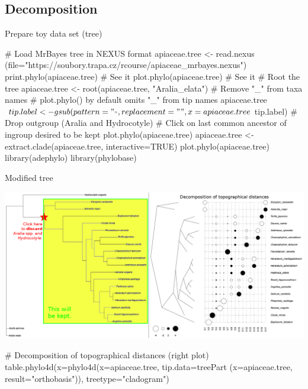 \documentclass[compress, ucs, xelatex, 11pt, xcolor=svgnames,
	hyperref={
		bookmarks=true,
		unicode=true,
		colorlinks=true,
		pdftitle={Molecular data in R},
		plainpages=false,
		pdfauthor={Vojtech Zeisek},
		pdfsubject={Course about phylogeny and evolution in R},
		pdfcreator={XeLaTeX},
		pdfkeywords={R, evolution, phylogeny, molecular data},
		linkcolor=Tomato,
		anchorcolor=SaddleBrown,
		citecolor=Goldenrod,
		filecolor=DarkMagenta,
		menucolor=Sienna,
		urlcolor=DarkTurquoise,
		pdftex},
	url={hyphens, lowtilde} %
	]{beamer}
\begin{document}
\subsection{Decomposition}

\begin{frame}[fragile]{Prepare toy data set (tree)}
	\begin{spluscode}
    # Load MrBayes tree in NEXUS format
    apiaceae.tree <- read.nexus
      (file="https://soubory.trapa.cz/rcourse/apiaceae_mrbayes.nexus")
    print.phylo(apiaceae.tree) # See it
    plot.phylo(apiaceae.tree) # See it
    # Root the tree
    apiaceae.tree <- root(apiaceae.tree, "Aralia_elata")
    # Remove "_" from taxa names
    # plot.phylo() by default omits "_" from tip names
    apiaceae.tree$tip.label <- gsub(pattern="_", replacement=" ",
      x=apiaceae.tree$tip.label)
    # Drop outgroup (Aralia and Hydrocotyle)
    # Click on last common ancestor of ingroup desired to be kept
    plot.phylo(apiaceae.tree)
    apiaceae.tree <- extract.clade(apiaceae.tree, interactive=TRUE)
    plot.phylo(apiaceae.tree)
    library(adephylo)
    library(phylobase)
	\end{spluscode}
\end{frame}

\begin{frame}[fragile]{Modified tree}
	\begin{center}
		\includegraphics[width=\textwidth-2cm]{apiaceae_tree.png}
	\end{center}
	\begin{spluscode}
    # Decomposition of topographical distances (right plot)
    table.phylo4d(x=phylo4d(x=apiaceae.tree, tip.data=treePart
      (x=apiaceae.tree, result="orthobasis")), treetype="cladogram")
	\end{spluscode}
\end{frame}
\end{document}
